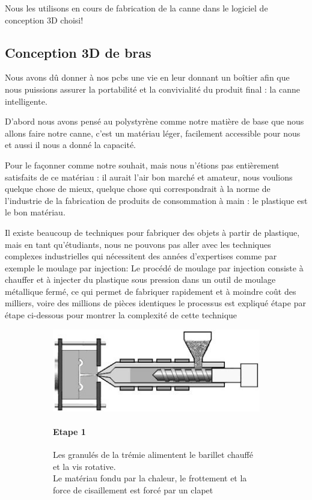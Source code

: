 \FloatBarrier

Nous les utilisons en cours de fabrication de la canne dans le logiciel de conception 3D choisi!

\subsection{Conception 3D de bras}
Nous avons dû donner à nos pcbs une vie en leur donnant un boîtier afin que nous puissions assurer la portabilité et la convivialité du produit final : la canne intelligente.

D’abord nous avons pensé au polystyrène comme notre matière de base que nous allons faire notre canne, c’est un matériau léger, facilement accessible pour nous et aussi il nous a donné la capacité.

Pour le façonner comme notre souhait, mais nous n’étions pas entièrement satisfaits de ce matériau : il aurait l’air bon marché et amateur, nous voulions quelque chose de mieux, quelque chose qui correspondrait à la norme de l’industrie de la fabrication de produits de consommation à main : le plastique est le bon matériau.

Il existe beaucoup de techniques pour fabriquer des objets à partir de plastique, mais en tant qu’étudiants, nous ne pouvons pas aller avec les techniques complexes industrielles qui nécessitent des années d’expertises comme par exemple le moulage par injection:
Le procédé de moulage par injection consiste à chauffer et à injecter du plastique sous pression dans un outil de moulage métallique fermé, ce qui permet de fabriquer rapidement et à moindre coût des milliers, voire des millions de pièces identiques
le processus est expliqué étape par étape ci-dessous pour montrer la complexité de cette technique

\begin{figure}[!htbp]
    \centering
    \begin{subfigure}[m]{.55\linewidth}
        \centering
        \includegraphics[width=\textwidth]{assets/conception1/img90.jpg}
    \end{subfigure}
    \hfill
    \begin{subfigure}[m]{.4\linewidth}
       \paragraph*{Etape 1}
        Les granulés de la trémie alimentent le barillet chauffé et la vis rotative. \\
        Le matériau fondu par la chaleur, le frottement et la force de cisaillement est forcé par un clapet
    \end{subfigure}
\end{figure}

